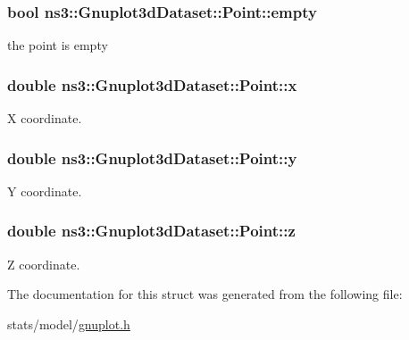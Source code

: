 \subsubsection[{\texorpdfstring{empty}{empty}}]{\setlength{\rightskip}{0pt plus 5cm}bool ns3\+::\+Gnuplot3d\+Dataset\+::\+Point\+::empty}\hypertarget{structns3_1_1Gnuplot3dDataset_1_1Point_a65c0d42073aba8f1f7cb3d2546f815c9}{}\label{structns3_1_1Gnuplot3dDataset_1_1Point_a65c0d42073aba8f1f7cb3d2546f815c9}


the point is empty 

\subsubsection[{\texorpdfstring{x}{x}}]{\setlength{\rightskip}{0pt plus 5cm}double ns3\+::\+Gnuplot3d\+Dataset\+::\+Point\+::x}\hypertarget{structns3_1_1Gnuplot3dDataset_1_1Point_a70d7da4551623eb178ebafdd22c30b68}{}\label{structns3_1_1Gnuplot3dDataset_1_1Point_a70d7da4551623eb178ebafdd22c30b68}


X coordinate. 

\subsubsection[{\texorpdfstring{y}{y}}]{\setlength{\rightskip}{0pt plus 5cm}double ns3\+::\+Gnuplot3d\+Dataset\+::\+Point\+::y}\hypertarget{structns3_1_1Gnuplot3dDataset_1_1Point_ad36535d92d8d0c7df125403786befa5c}{}\label{structns3_1_1Gnuplot3dDataset_1_1Point_ad36535d92d8d0c7df125403786befa5c}


Y coordinate. 

\subsubsection[{\texorpdfstring{z}{z}}]{\setlength{\rightskip}{0pt plus 5cm}double ns3\+::\+Gnuplot3d\+Dataset\+::\+Point\+::z}\hypertarget{structns3_1_1Gnuplot3dDataset_1_1Point_ac41d68d8f36f65d100382746440ab40a}{}\label{structns3_1_1Gnuplot3dDataset_1_1Point_ac41d68d8f36f65d100382746440ab40a}


Z coordinate. 



The documentation for this struct was generated from the following file\+:\begin{DoxyCompactItemize}
\item 
stats/model/\hyperlink{gnuplot_8h}{gnuplot.\+h}\end{DoxyCompactItemize}
